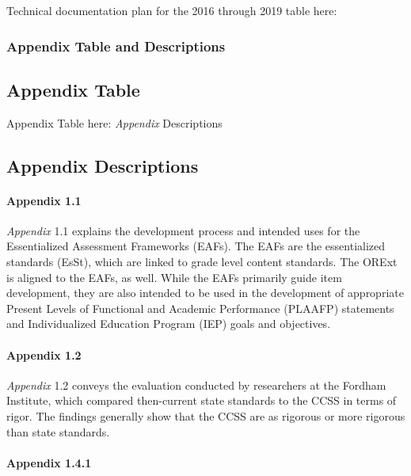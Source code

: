 \documentclass[]{article}
\let\oldparagraph\paragraph
\renewcommand{\paragraph}[1]{\oldparagraph{#1}\mbox{}}
\begin{document}
Technical documentation plan for the 2016 through 2019 table here:

\subsubsection{Appendix Table and
Descriptions}\label{appendix-table-and-descriptions}

\subsection{Appendix Table}\label{appendix-table}

Appendix Table here: \emph{Appendix} Descriptions

\subsection{Appendix Descriptions}\label{appendix-descriptions}

\paragraph{Appendix 1.1}\label{appendix-1.1}

\emph{Appendix} 1.1 explains the development process and intended uses
for the Essentialized Assessment Frameworks (EAFs). The EAFs are the
essentialized standards (EsSt), which are linked to grade level content
standards. The ORExt is aligned to the EAFs, as well. While the EAFs
primarily guide item development, they are also intended to be used in
the development of appropriate Present Levels of Functional and Academic
Performance (PLAAFP) statements and Individualized Education Program
(IEP) goals and objectives.

\paragraph{Appendix 1.2}\label{appendix-1.2}

\emph{Appendix} 1.2 conveys the evaluation conducted by researchers at
the Fordham Institute, which compared then-current state standards to
the CCSS in terms of rigor. The findings generally show that the CCSS
are as rigorous or more rigorous than state standards.

\paragraph{Appendix 1.4.1}\label{appendix-1.4.1}
\end{document}
